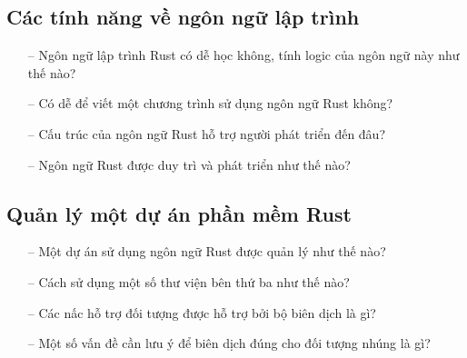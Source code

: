 \subsection{Các tính năng về ngôn ngữ lập trình}
\begin{itemize}
    \item[--] Ngôn ngữ lập trình Rust có dễ học không, tính logic của ngôn ngữ này như thế nào?
    \item[--] Có dễ để viết một chương trình sử dụng ngôn ngữ Rust không?
    \item[--] Cấu trúc của ngôn ngữ Rust hỗ trợ người phát triển đến đâu?
    \item[--] Ngôn ngữ Rust được duy trì và phát triển như thế nào?
\end{itemize}

\subsection{Quản lý một dự án phần mềm Rust}
\begin{itemize}
    \item[--]Một dự án sử dụng ngôn ngữ Rust được quản lý như thế nào?
    \item[--]Cách sử dụng một số thư viện bên thứ ba như thế nào?
    \item[--]Các nấc hỗ trợ đối tượng được hỗ trợ bởi bộ biên dịch là gì?
    \item[--]Một số vấn đề cần lưu ý để biên dịch đúng cho đối tượng nhúng là gì?
\end{itemize}

